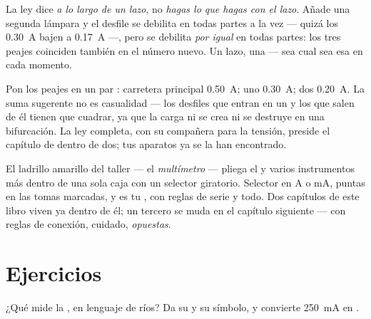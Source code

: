 \begin{example}\label{ex:g8:intensity-ammeter:fineprint}
La ley dice \emph{a lo largo de un lazo}, no \emph{hagas lo que hagas
con el lazo}. Añade una segunda lámpara  y el desfile se
debilita en todas partes a la vez --- quizá los \qty{0.30}{A} bajen a
\qty{0.17}{A} ---, pero se debilita \emph{por igual} en todas partes:
los tres peajes coinciden también en el número nuevo. Un lazo, una
 --- sea cual sea esa  en cada
momento.
\end{example}

\begin{example}\label{ex:g8:intensity-ammeter:junction}
Pon los peajes en un par : carretera principal
\qty{0.50}{A};  uno \qty{0.30}{A};  dos
\qty{0.20}{A}. La suma sugerente no es casualidad --- los desfiles que
entran en un  y los que salen de él tienen que cuadrar, ya que
la carga ni se crea ni se destruye en una bifurcación. La ley completa,
con su compañera para la tensión, preside el capítulo de dentro de dos;
tus aparatos ya se la han encontrado.
\end{example}

\begin{remark}[El multímetro]\label{rem:g8:intensity-ammeter:multimeter}
El ladrillo amarillo del taller --- el \emph{multímetro} --- pliega el
 y varios instrumentos más dentro de una sola caja con
un selector giratorio. Selector en \unit{A} o \unit{mA}, puntas en las
tomas marcadas, y es tu , con reglas de serie y todo.
Dos capítulos de este libro viven ya dentro de él; un tercero se muda
en el capítulo siguiente --- con reglas de conexión, cuidado,
\emph{opuestas}.
\end{remark}

\section{Ejercicios}

\begin{exercise}[$\star$]\label{exo:g8:intensity-ammeter:1}
¿Qué mide la , en lenguaje de ríos? Da su
 y su símbolo, y convierte \qty{250}{mA} en
.
\end{exercise}

